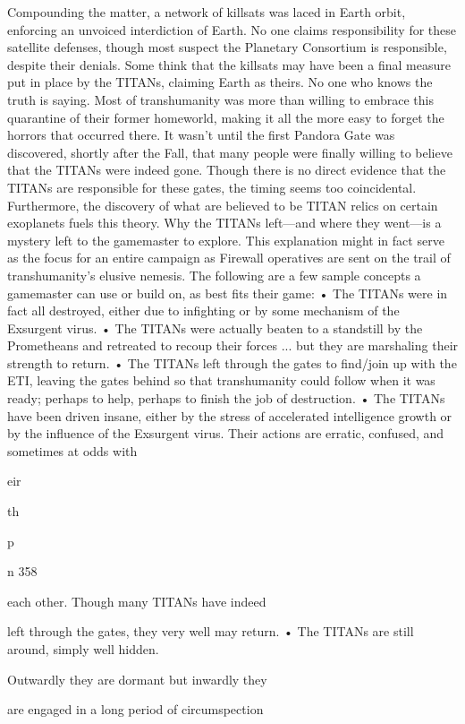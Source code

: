 Compounding the matter, a network of killsats was 
laced in Earth orbit, enforcing an unvoiced interdiction 
of Earth. No one claims responsibility for these satellite 
defenses, though most suspect the Planetary Consortium
is responsible, despite their denials. Some think
that the killsats may have been a final measure put in 
place by the TITANs, claiming Earth as theirs. No one 
who knows the truth is saying. Most of transhumanity 
was more than willing to embrace this quarantine of 
their former homeworld, making it all the more easy to 
forget the horrors that occurred there. 
It wasn't until the first Pandora Gate was 
discovered, shortly after the Fall, that many people 
were finally willing to believe that the TITANs were 
indeed gone. Though there is no direct evidence that 
the TITANs are responsible for these gates, the timing 
seems too coincidental. Furthermore, the discovery 
of what are believed to be TITAN relics on certain 
exoplanets fuels this theory.
Why the TITANs left—and where they went—is 
a mystery left to the gamemaster to explore. This explanation
might in fact serve as the focus for an entire
campaign as Firewall operatives are sent on the trail 
of transhumanity's elusive nemesis. The following are 
a few sample concepts a gamemaster can use or build 
on, as best fits their game:
•  The TITANs were in fact all destroyed, either 
due to infighting or by some mechanism of the 
Exsurgent virus. 
•  The TITANs were actually beaten to a standstill 
by the Prometheans and retreated to recoup their 
forces ... but they are marshaling their strength 
to return.
•  The TITANs left through the gates to find/join up 
with the ETI, leaving the gates behind so that transhumanity
could follow when it was ready; perhaps
to help, perhaps to finish the job of destruction.
•  The TITANs have been driven insane, either by 
the stress of accelerated intelligence growth or by 
the influence of the Exsurgent virus. Their actions 
are erratic, confused, and sometimes at odds with 

eir 

th

p

n
358

each other. Though many TITANs have indeed 

left through the gates, they very well may return.
•  The TITANs are still around, simply well hidden. 

Outwardly they are dormant but inwardly they 

are engaged in a long period of circumspection 

